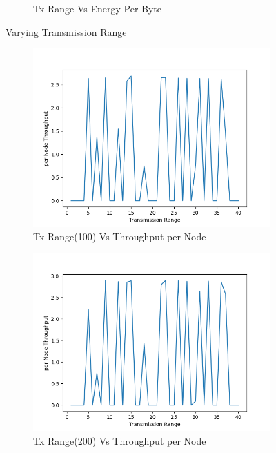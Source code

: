\begin{figure}[h]
\begin{subfigure}{.5\textwidth}
     \caption{Tx Range Vs Energy Per Byte}
     \label{tx_range_energy_per_byte}
\end{subfigure}
\caption{Varying Transmission Range}
\label{fig:varyingTxRange}
\end{figure}
\begin{figure}[h]
\begin{subfigure}{.5\textwidth}
  \centering
  \includegraphics[width=.8\linewidth]{_15_4_static/TransmissionRange(100)vsperNodeThroughput.png}
     \caption{Tx Range(100) Vs Throughput per Node}
 \end{subfigure}
\begin{subfigure}{.5\textwidth}
  \centering
  \includegraphics[width=.8\linewidth]{_15_4_static/TransmissionRange(200)vsperNodeThroughput.png}
     \caption{Tx Range(200) Vs Throughput per Node}
    \end{subfigure}
\begin{subfigure}{.5\textwidth}
    \centering

\end{subfigure}
\end{figure}
